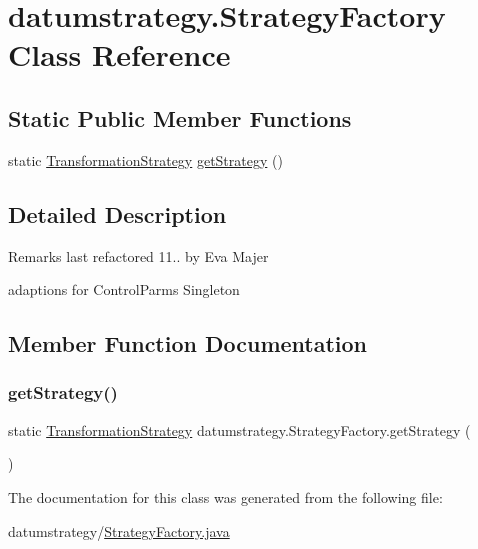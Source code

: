 \hypertarget{classdatumstrategy_1_1_strategy_factory}{}\section{datumstrategy.\+Strategy\+Factory Class Reference}
\label{classdatumstrategy_1_1_strategy_factory}
\subsection*{Static Public Member Functions}
\begin{DoxyCompactItemize}
\item 
static \hyperlink{classdatumstrategy_1_1_transformation_strategy}{Transformation\+Strategy} \hyperlink{classdatumstrategy_1_1_strategy_factory_ae4a4ba7b0de4f6309e3c7b75909f1a3a}{get\+Strategy} ()
\end{DoxyCompactItemize}


\subsection{Detailed Description}
\begin{DoxyRemark}{Remarks}
last refactored 11.. by Eva Majer ~\newline
 
\begin{DoxyItemize}
\item adaptions for Control\+Parms Singleton 
\end{DoxyItemize}
\end{DoxyRemark}


\subsection{Member Function Documentation}
\mbox{\label{classdatumstrategy_1_1_strategy_factory_ae4a4ba7b0de4f6309e3c7b75909f1a3a}} 
\subsubsection{\texorpdfstring{get\+Strategy()}{getStrategy()}}
{\footnotesize\ttfamily static \hyperlink{classdatumstrategy_1_1_transformation_strategy}{Transformation\+Strategy} datumstrategy.\+Strategy\+Factory.\+get\+Strategy (\begin{DoxyParamCaption}{ }\end{DoxyParamCaption})\hspace{0.3cm}{\ttfamily [static]}}



The documentation for this class was generated from the following file\+:\begin{DoxyCompactItemize}
\item 
datumstrategy/\hyperlink{_strategy_factory_8java}{Strategy\+Factory.\+java}\end{DoxyCompactItemize}
